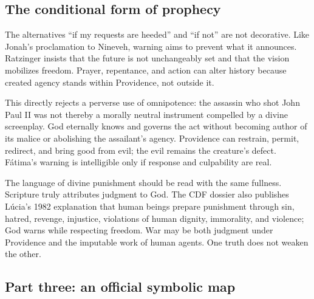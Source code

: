 \subsection{The conditional form of prophecy}

The alternatives “if my requests are heeded” and “if not” are not decorative. Like Jonah's proclamation to Nineveh, warning aims to prevent what it announces. Ratzinger insists that the future is not unchangeably set and that the vision mobilizes freedom. Prayer, repentance, and action can alter history because created agency stands within Providence, not outside it.

This directly rejects a perverse use of omnipotence: the assassin who shot John Paul II was not thereby a morally neutral instrument compelled by a divine screenplay. God eternally knows and governs the act without becoming author of its malice or abolishing the assailant's agency. Providence can restrain, permit, redirect, and bring good from evil; the evil remains the creature's defect. Fátima's warning is intelligible only if response and culpability are real.

The language of divine punishment should be read with the same fullness. Scripture truly attributes judgment to God. The CDF dossier also publishes Lúcia's 1982 explanation that human beings prepare punishment through sin, hatred, revenge, injustice, violations of human dignity, immorality, and violence; God warns while respecting freedom. War may be both judgment under Providence and the imputable work of human agents. One truth does not weaken the other.

\subsection{Part three: an official symbolic map}

